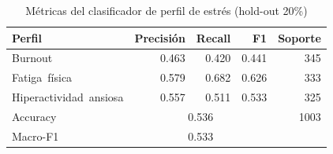 \begin{table}[ht]
\centering
\caption{Métricas del clasificador de perfil de estrés (hold-out 20\%)}
\label{tab:stress-metrics}
\begin{tabular}{lrrrr}
\hline
Perfil & Precisión & Recall & F1 & Soporte \\
\hline
Burnout & 0.463 & 0.420 & 0.441 & 345 \\
Fatiga~física & 0.579 & 0.682 & 0.626 & 333 \\
Hiperactividad~ansiosa & 0.557 & 0.511 & 0.533 & 325 \\
\hline
Accuracy & \multicolumn{3}{c}{0.536} & 1003 \\
Macro-F1 & \multicolumn{3}{c}{0.533} & \\
\hline
\end{tabular}
\end{table}